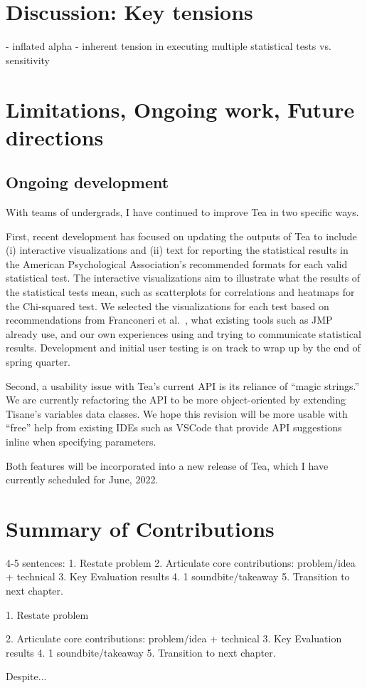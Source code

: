 \section{Discussion: Key tensions}
- inflated alpha
- inherent tension in executing multiple statistical tests vs. sensitivity

\section{Limitations, Ongoing work, Future directions}

\subsection{Ongoing development}
With teams of undergrads, I have continued to improve Tea in two specific ways. 

First, recent development has focused on updating the outputs of Tea to include
(i) interactive visualizations and (ii) text for reporting the statistical
results in the American Psychological Association's recommended formats for each
valid statistical test. The interactive visualizations aim to illustrate what
the results of the statistical tests mean, such as scatterplots for correlations
and heatmaps for the Chi-squared test. We selected the visualizations for each
test based on recommendations from Franconeri et
al.~\cite{franconeriVisualizationChooser}, what existing tools such as
JMP~\cite{jmp} already use, and our own experiences using and trying to
communicate statistical results. Development and initial user testing is on
track to wrap up by the end of spring quarter. 

Second, a usability issue with Tea's current API is its reliance of ``magic
strings.'' We are currently refactoring the API to be more object-oriented by
extending Tisane's variables data classes. We hope this revision will be more
usable with ``free'' help from existing IDEs such as VSCode that provide API
suggestions inline when specifying parameters. 

Both features will be incorporated into a new release of Tea, which I have
currently scheduled for June, 2022. 

\section{Summary of Contributions}
4-5 sentences: 
1. Restate problem 
2. Articulate core contributions: problem/idea + technical
3. Key Evaluation results
4. 1 soundbite/takeaway
5. Transition to next chapter. 

1. Restate problem 

2. Articulate core contributions: problem/idea + technical
3. Key Evaluation results
4. 1 soundbite/takeaway
5. Transition to next chapter. 

Despite...


